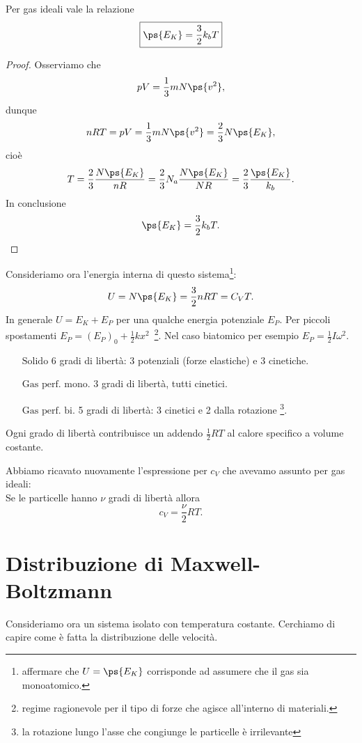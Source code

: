 \begin{proposition}
Per gas ideali vale la relazione
\[\boxed{\ps{E_K}=\frac32 k_b T}\]
\end{proposition}
\begin{proof}
Osserviamo che
\[pV=\frac13 mN\ps{v^2},\]
dunque
\[nRT=pV=\frac13 mN\ps{v^2}=\frac23N\ps{E_K},\]
cio\`e
\[T=\frac 23\frac{N\ps{E_K}}{nR}=\frac 23N_a\frac{N\ps{E_K}}{NR}=\frac 23\frac{\ps{E_K}}{k_b}.\]
In conclusione
\[\ps{E_K}=\frac32 k_b T.\]
\end{proof}

\noindent
Consideriamo ora l'energia interna di questo sistema\footnote{affermare che $U=\ps{E_K}$ corrisponde ad assumere che il gas sia monoatomico.}:
\[U=N\ps{E_K}=\frac32nRT=C_VT.\]
In generale $U=E_K+E_P$ per una qualche energia potenziale $E_P$. Per piccoli spostamenti $E_P=(E_P)_0+\frac12kx^2$\ \footnote{regime ragionevole per il tipo di forze che agisce all'interno di materiali.}. Nel caso biatomico per esempio $E_P=\frac12I\omega^2$.
\setlength{\leftmargini}{0cm}
\begin{itemize}
\item[$\boxed{\text{Solido}}$] 6 gradi di libert\`a: 3 potenziali (forze elastiche) e 3 cinetiche.
\item[$\boxed{\text{Gas perf. mono.}}$] 3 gradi di libert\`a, tutti cinetici.
\item[$\boxed{\text{Gas perf. bi.}}$] 5 gradi di libert\`a: 3 cinetici e 2 dalla rotazione \footnote{la rotazione lungo l'asse che congiunge le particelle \`e irrilevante}.
\end{itemize}
\setlength{\leftmargini}{0.5cm}


\begin{fact}
Ogni grado di libert\`a contribuisce un addendo $\frac12 RT$ al calore specifico a volume costante.
\end{fact}

\begin{remark}
Abbiamo ricavato nuovamente l'espressione per $c_V$ che avevamo assunto per gas ideali:\\
Se le particelle hanno $\nu$ gradi di libert\`a allora
\[c_V=\frac\nu2RT.\]
\end{remark}

\section{Distribuzione di Maxwell-Boltzmann}
Consideriamo ora un sistema isolato con temperatura costante. Cerchiamo di capire come \`e fatta la distribuzione delle velocit\`a.\medskip


